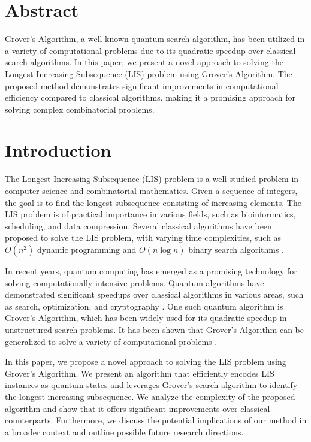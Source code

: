 \section{Abstract}

Grover's Algorithm, a well-known quantum search algorithm, has been utilized in a variety of computational problems due to its quadratic speedup over classical search algorithms. In this paper, we present a novel approach to solving the Longest Increasing Subsequence (LIS) problem using Grover's Algorithm. The proposed method demonstrates significant improvements in computational efficiency compared to classical algorithms, making it a promising approach for solving complex combinatorial problems.

\section{Introduction}

The Longest Increasing Subsequence (LIS) problem is a well-studied problem in computer science and combinatorial mathematics. Given a sequence of integers, the goal is to find the longest subsequence consisting of increasing elements. The LIS problem is of practical importance in various fields, such as bioinformatics, scheduling, and data compression. Several classical algorithms have been proposed to solve the LIS problem, with varying time complexities, such as $O(n^2)$ dynamic programming and $O(n\log{n})$ binary search algorithms \cite{fredman1976good,skiena1997algorithm}.

In recent years, quantum computing has emerged as a promising technology for solving computationally-intensive problems. Quantum algorithms have demonstrated significant speedups over classical algorithms in various areas, such as search, optimization, and cryptography \cite{shor1999polynomial,grover1996fast}. One such quantum algorithm is Grover's Algorithm, which has been widely used for its quadratic speedup in unstructured search problems. It has been shown that Grover's Algorithm can be generalized to solve a variety of computational problems \cite{brassard1997exact,nielsen2010quantum}.

In this paper, we propose a novel approach to solving the LIS problem using Grover's Algorithm. We present an algorithm that efficiently encodes LIS instances as quantum states and leverages Grover's search algorithm to identify the longest increasing subsequence. We analyze the complexity of the proposed algorithm and show that it offers significant improvements over classical counterparts. Furthermore, we discuss the potential implications of our method in a broader context and outline possible future research directions.

